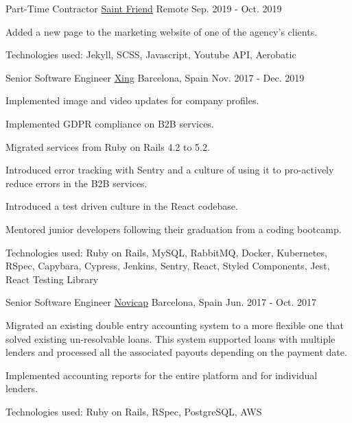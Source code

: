 \documentclass[11pt, a4paper]{awesome-cv}
\begin{document}
\begin{cventries}
  \cventry
    {Part-Time Contractor} %
    {\href{https://www.saintfriend.co/}{Saint Friend}} %
    {Remote} %
    {Sep. 2019 - Oct. 2019} %
    {
      \begin{cvitems} %
        \item {Added a new page to the marketing website of one of the agency's clients.}
        \item {Technologies used: Jekyll, SCSS, Javascript, Youtube API, Aerobatic}
      \end{cvitems}
    }

  \cventry
    {Senior Software Engineer} %
    {\href{https://www.xing.com/}{Xing}} %
    {Barcelona, Spain} %
    {Nov. 2017 - Dec. 2019} %
    {
      \begin{cvitems} %
        \item {Implemented image and video updates for company profiles.}
        \item {Implemented GDPR compliance on B2B services.}
        \item {Migrated services from Ruby on Rails 4.2 to 5.2.}
        \item {Introduced error tracking with Sentry and a culture of using it to pro-actively reduce errors in the B2B services.}
        \item {Introduced a test driven culture in the React codebase.}
        \item {Mentored junior developers following their graduation from a coding bootcamp.}
        \item {Technologies used: Ruby on Rails, MySQL, RabbitMQ, Docker, Kubernetes, RSpec, Capybara, Cypress, Jenkins, Sentry, React, Styled Components, Jest, React Testing Library}
      \end{cvitems}
    }

  \cventry
    {Senior Software Engineer} %
    {\href{https://novicap.com/}{Novicap}} %
    {Barcelona, Spain} %
    {Jun. 2017 - Oct. 2017} %
    {
      \begin{cvitems} %
        \item {Migrated an existing double entry accounting system to a more flexible one that solved existing un-resolvable loans. This system supported loans with multiple lenders and processed all the associated payouts depending on the payment date.}
        \item {Implemented accounting reports for the entire platform and for individual lenders.}
        \item {Technologies used: Ruby on Rails, RSpec, PostgreSQL, AWS}
      \end{cvitems}
    }


\end{cventries}
\end{document}
